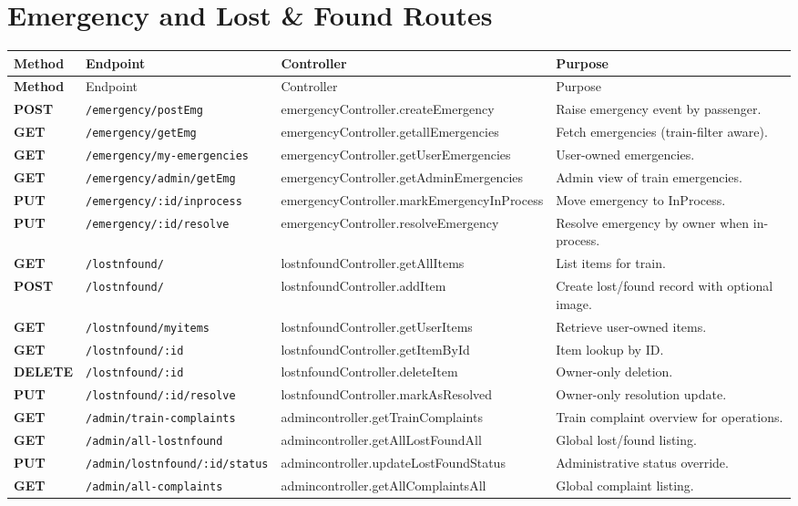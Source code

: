 \documentclass[12pt,a4paper]{report}
\renewcommand{\toprule}{\hline\hline}
\renewcommand{\midrule}{\hline}
\renewcommand{\bottomrule}{\hline\hline}
\begin{document}
\section{Emergency and Lost \& Found Routes}
\begin{longtable}{>{\bfseries}p{} p{} p{} p{}}
\toprule
\rowcolor{TableHeader}
\textcolor{TableHeaderText}{Method} & \textcolor{TableHeaderText}{Endpoint} & \textcolor{TableHeaderText}{Controller} & \textcolor{TableHeaderText}{Purpose} \\
\midrule
\endfirsthead
\toprule
\rowcolor{TableHeader}
\textcolor{TableHeaderText}{Method} & \textcolor{TableHeaderText}{Endpoint} & \textcolor{TableHeaderText}{Controller} & \textcolor{TableHeaderText}{Purpose} \\
\midrule
\endhead
POST & \texttt{/emergency/postEmg} & emergencyController.createEmergency & Raise emergency event by passenger. \\
GET & \texttt{/emergency/getEmg} & emergencyController.getallEmergencies & Fetch emergencies (train-filter aware). \\
GET & \texttt{/emergency/my-emergencies} & emergencyController.getUserEmergencies & User-owned emergencies. \\
GET & \texttt{/emergency/admin/getEmg} & emergencyController.getAdminEmergencies & Admin view of train emergencies. \\
PUT & \texttt{/emergency/:id/inprocess} & emergencyController.markEmergencyInProcess & Move emergency to InProcess. \\
PUT & \texttt{/emergency/:id/resolve} & emergencyController.resolveEmergency & Resolve emergency by owner when in-process. \\
GET & \texttt{/lostnfound/} & lostnfoundController.getAllItems & List items for train. \\
POST & \texttt{/lostnfound/} & lostnfoundController.addItem & Create lost/found record with optional image. \\
GET & \texttt{/lostnfound/myitems} & lostnfoundController.getUserItems & Retrieve user-owned items. \\
GET & \texttt{/lostnfound/:id} & lostnfoundController.getItemById & Item lookup by ID. \\
DELETE & \texttt{/lostnfound/:id} & lostnfoundController.deleteItem & Owner-only deletion. \\
PUT & \texttt{/lostnfound/:id/resolve} & lostnfoundController.markAsResolved & Owner-only resolution update. \\
GET & \texttt{/admin/train-complaints} & admincontroller.getTrainComplaints & Train complaint overview for operations. \\
GET & \texttt{/admin/all-lostnfound} & admincontroller.getAllLostFoundAll & Global lost/found listing. \\
PUT & \texttt{/admin/lostnfound/:id/status} & admincontroller.updateLostFoundStatus & Administrative status override. \\
GET & \texttt{/admin/all-complaints} & admincontroller.getAllComplaintsAll & Global complaint listing. \\
\bottomrule
\end{longtable}
\end{document}
